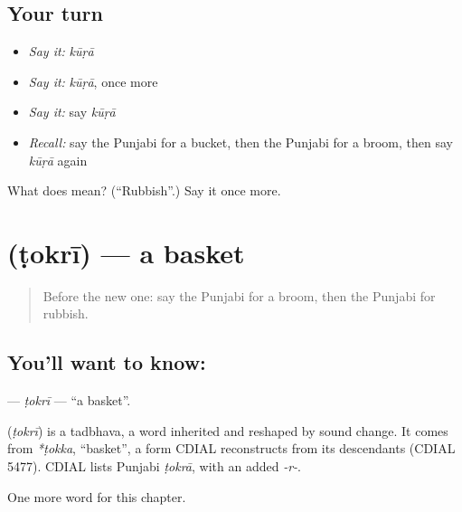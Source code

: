 \subsection*{Your turn}
\begin{itemize}
\raggedright
  \item \emph{Say it:} \emph{kūṛā}
  \item \emph{Say it:} \emph{kūṛā}, once more
  \item \emph{Say it:} say \emph{kūṛā}
  \item \emph{Recall:} say the Punjabi for a bucket, then the Punjabi for a broom, then say \emph{kūṛā} again
\end{itemize}

\begin{tcolorbox}[breakable,colback=teal!4,colframe=teal!35!black,title={Before you move on}]
What does  mean? (\textquotedblleft{}Rubbish\textquotedblright{}.) Say it once more.
\end{tcolorbox}
\section[\texorpdfstring{\pa{ਟੋਕਰੀ} (ṭokrī)}{ਟੋਕਰੀ (ṭokrī)}]{ (ṭokrī) — a basket}

\label{lesson:PA-C117-tokri}



\begin{quote}
Before the new one: say the Punjabi for a broom, then the Punjabi for rubbish.
\end{quote}

\subsection*{You'll want to know: }
\textbf{} — \emph{ṭokrī} — \textquotedblleft{}a basket\textquotedblright{}.

\begin{cousinweb}
\textbf{} (\emph{ṭokrī}) is a tadbhava, a word inherited and reshaped by sound change. It comes from \emph{*ṭokka}, \textquotedblleft{}basket\textquotedblright{}, a form CDIAL reconstructs from its descendants (CDIAL 5477). CDIAL lists Punjabi \emph{ṭokrā}, with an added \emph{-r-}.
\end{cousinweb}

\begin{grammarlens}[title={What you've built}]
One more word for this chapter.
\end{grammarlens}

